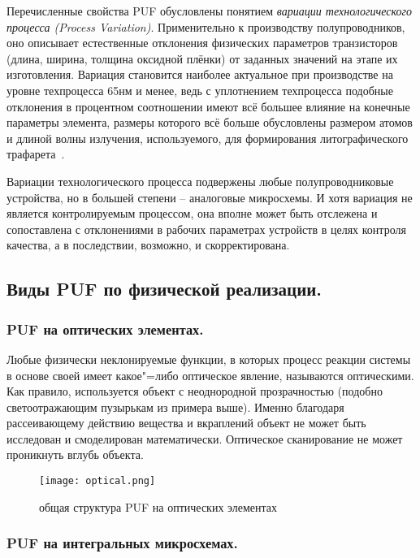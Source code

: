 Перечисленные свойства PUF обусловлены понятием \emph{вариации технологического процесса (Process Variation)}. Применительно к производству полупроводников, оно описывает естественные отклонения физических параметров транзисторов (длина, ширина, толщина оксидной плёнки) от заданных значений на этапе их изготовления. Вариация становится наиболее актуальное при производстве на уровне техпроцесса 65нм и менее, ведь с уплотнением техпроцесса подобные отклонения в процентном соотношении имеют всё большее влияние на конечные параметры элемента, размеры которого всё больше обусловлены размером атомов и длиной волны излучения, используемого, для формирования литографического трафарета~\cite{process_variation}.

Вариации технологического процесса подвержены любые полупроводниковые устройства, но в большей степени -- аналоговые микросхемы. И хотя вариация не является контролируемым процессом, она вполне может быть отслежена и сопоставлена с отклонениями в рабочих параметрах устройств в целях контроля качества, а в последствии, возможно, и скорректирована.



\subsection{Виды PUF по физической реализации. }
\label{sub:domain:puf_physical_types}


\subsubsection{PUF на оптических элементах. }
\label{sub:domain:puf_physical_types:optical}

Любые физически неклонируемые функции, в которых процесс реакции системы в основе своей имеет какое"=либо оптическое явление, называются оптическими.
Как правило, используется объект с неоднородной прозрачностью (подобно светоотражающим пузырькам из примера выше). Именно благодаря рассеивающему действию вещества и вкраплений объект не может быть исследован и смоделирован математически. Оптическое сканирование не может проникнуть вглубь объекта.
\begin{figure}[ht]
    \centering
    \label{fig:domain:puf_physical_types:optical}
    \texttt{[image: optical.png]}
    \caption{общая структура PUF на оптических элементах}
\end{figure}


\subsubsection{PUF на интегральных микросхемах. }
\label{sub:domain:puf_physical_types:ic}

